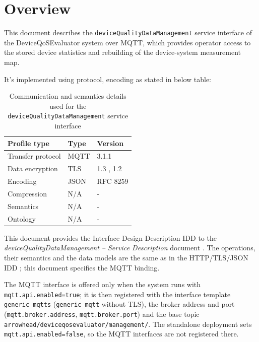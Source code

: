 \documentclass[a4paper]{arrowhead}
\begin{document}
\section{Overview}
\label{sec:overview}

This document describes the \texttt{device\allowbreak{}Quality\allowbreak{}Data\allowbreak{}Management} service interface of the DeviceQoSEvaluator system over MQTT, which provides operator access to the stored device statistics and rebuilding of the device-system measurement map.

It's implemented using protocol, encoding as stated in below table:
\begin{table}[ht!]
  \centering
  \begin{tabular}{|l|l|l|}
    \hline
    \rowcolor{gray!33} Profile type & Type & Version \\ \hline
    Transfer protocol & MQTT & 3.1.1 \cite{mqtt311} \\ \hline
    Data encryption & TLS & 1.3 \cite{rfc8446}, 1.2 \cite{rfc5246} \\ \hline
    Encoding & JSON & RFC 8259 \cite{rfc8259} \\ \hline
    Compression & N/A & - \\ \hline
    Semantics & N/A & - \\ \hline
    Ontology & N/A & - \\ \hline
  \end{tabular}
  \caption{Communication and semantics details used for the \texttt{device\allowbreak{}Quality\allowbreak{}Data\allowbreak{}Management} service interface}
  \label{tab:comunication_semantics_profile}
\end{table}

This document provides the Interface Design Description IDD to the \textit{deviceQualityDataManagement -- Service Description} document \cite{dqe-deviceQualityDataManagement-sd}.
The operations, their semantics and the data models are the same as in the HTTP/TLS/JSON IDD \cite{dqe-deviceQualityDataManagement-http-idd}; this document specifies the MQTT binding.

The MQTT interface is offered only when the system runs with \texttt{mqtt.api.enabled=true}; it is then registered with the interface template \texttt{generic\_\allowbreak{}mqtts} (\texttt{generic\_\allowbreak{}mqtt} without TLS), the broker address and port (\texttt{mqtt.\allowbreak{}broker.\allowbreak{}address}, \texttt{mqtt.\allowbreak{}broker.\allowbreak{}port}) and the base topic \texttt{arrowhead/\allowbreak{}deviceqosevaluator/\allowbreak{}management/\allowbreak{}}. The standalone deployment sets \texttt{mqtt.\allowbreak{}api.\allowbreak{}enabled=\allowbreak{}false}, so the MQTT interfaces are not registered there.
\end{document}
